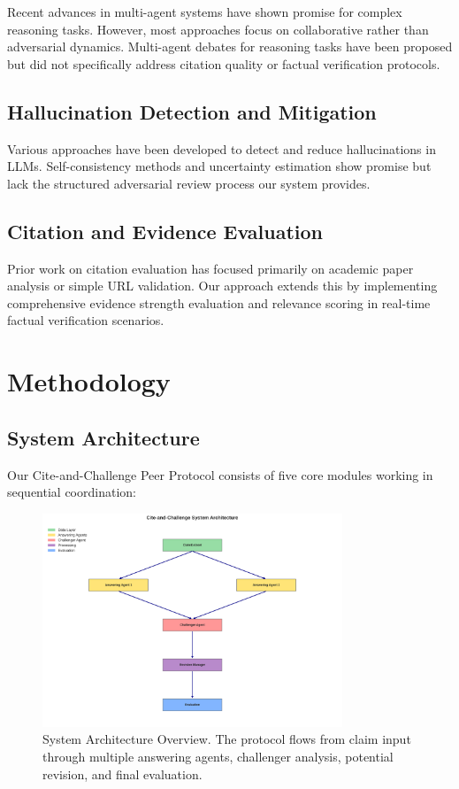 \documentclass[11pt,a4paper]{article}
\begin{document}
Recent advances in multi-agent systems have shown promise for complex reasoning tasks. However, most approaches focus on collaborative rather than adversarial dynamics. Multi-agent debates for reasoning tasks have been proposed but did not specifically address citation quality or factual verification protocols.

\subsection{Hallucination Detection and Mitigation}

Various approaches have been developed to detect and reduce hallucinations in LLMs. Self-consistency methods and uncertainty estimation show promise but lack the structured adversarial review process our system provides.

\subsection{Citation and Evidence Evaluation}

Prior work on citation evaluation has focused primarily on academic paper analysis or simple URL validation. Our approach extends this by implementing comprehensive evidence strength evaluation and relevance scoring in real-time factual verification scenarios.

\section{Methodology}

\subsection{System Architecture}

Our Cite-and-Challenge Peer Protocol consists of five core modules working in sequential coordination:

\begin{figure}[htbp]
\centering
\includegraphics[width=0.8\textwidth]{figures/system_architecture.png}
\caption{System Architecture Overview. The protocol flows from claim input through multiple answering agents, challenger analysis, potential revision, and final evaluation.}
\label{fig:architecture}
\end{figure}
\end{document}
